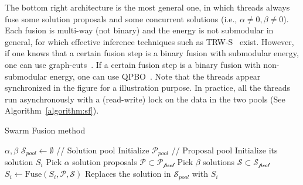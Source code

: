 %
The bottom right architecture is the most general one, in which threads
always fuse some solution proposals and  some concurrent solutions (i.e.,
$\alpha\ne 0, \beta \ne 0$).
%
Each fusion is multi-way (not binary) and the energy is not submodular
in general, for which effective inference techniques such as
TRW-S~\cite{TRW-S,opengm} exist.
However, if one knows that a certain fusion step is a binary fusion with
submodular energy, one can use
graph-cuts~\cite{alpha_expansion}. If a certain fusion step is a
binary fusion with non-submodular energy, one can use
QPBO~\cite{second_order_stereo}.
%
Note that the threads appear synchronized in the figure for a
illustration purpose. In practice, all the threads run asynchronously
with a (read-write) lock on the data in the two pools (See
Algorithm~\ref{algorithm:sf}).
%
%
%
\begin{algorithm}
 \caption{Swarm Fusion method}
 \label{algorithm:sf}
 \begin{algorithmic}
  \Procedure{} {$\alpha, \beta$}
  \State $\mathcal{S}_{pool} \leftarrow \emptyset$ //
  Solution pool
  \State Initialize $\mathcal{P}_{pool}$ // Proposal pool
  \State Initialize its solution $S_i$
  \EndFor
  \State
  \State Pick $\alpha$ solution proposals $\mathcal{P}\subset \mathcal{P_{\mbox{pool}}}$
  \State Pick $\beta$ solutions $\mathcal{S} \subset \mathcal{S_{\mbox{pool}}}$
  \State $S_i \leftarrow \mbox{Fuse}(S_i, \mathcal{P}, \mathcal{S})$
  \State Replaces the solution in $\mathcal{S}_{pool}$ with $S_i$
  \EndFor
  \EndProcedure
 \end{algorithmic}
\end{algorithm}



